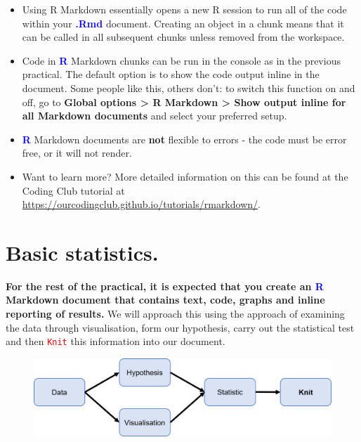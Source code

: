 \documentclass[a4paper,12pt]{article}
\newcommand\boldblue[1]{\textcolor{blue}{\textbf{#1}}}
\newcommand\code[1]{\textcolor{red}{\texttt{#1}}}
\begin{document}
\begin{itemize}

\item Using R Markdown essentially opens a new R session to run all of the code within your \boldblue{.Rmd} document. Creating an object in a chunk means that it can be called in all subsequent chunks unless removed from the workspace.

\item Code in \boldblue{R} Markdown chunks can be run in the console as in the previous practical. The default option is to show the code output inline in the document. Some people like this, others don't: to switch this function on and off, go to \textbf{Global options > R Markdown > Show output inline for all Markdown documents} and select your preferred setup.

\item \boldblue{R} Markdown documents are \textbf{not} flexible to errors - the code must be error free, or it will not render.

\item Want to learn more? More detailed information on this can be found at the Coding Club tutorial at \url{https://ourcodingclub.github.io/tutorials/rmarkdown/}. \\

\end{itemize}




\section{Basic statistics.}

\textbf{For the rest of the practical, it is expected that you create an \boldblue{R} Markdown document that contains text, code, graphs and inline reporting of results.} We will approach this using the  approach of examining the data through visualisation, form our hypothesis, carry out the statistical test and then \code{Knit} this information into our document. \\


\begin{figure}[h]
\centering 
\includegraphics[width=.8\textwidth]{figs/StatisticsFlow2.png}
\label{fig:StatisticsFlow}
\end{figure} 
\end{document}
